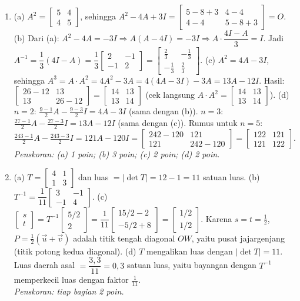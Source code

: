 \documentclass[a4paper,11pt]{article}
\newcommand{\sm}[1]{\left[\begin{smallmatrix}#1\end{smallmatrix}\right]}
\begin{document}
\begin{enumerate}[leftmargin=2em,itemsep=3pt,topsep=2pt]
\item[\textbf{3.}] (a) $A^2=\sm{5&4\\4&5}$, sehingga $A^2-4A+3I=\sm{5-8+3&4-4\\4-4&5-8+3}=O$. (b) Dari (a): $A^2-4A=-3I\Rightarrow A(A-4I)=-3I\Rightarrow A\cdot\dfrac{4I-A}{3}=I$. Jadi $A^{-1}=\dfrac13(4I-A)=\dfrac13\sm{2&-1\\-1&2}=\sm{\frac23&-\frac13\\-\frac13&\frac23}$. (c) $A^2=4A-3I$, sehingga $A^3=A\cdot A^2=4A^2-3A=4(4A-3I)-3A=13A-12I$. Hasil: $\sm{26-12&13\\13&26-12}=\sm{14&13\\13&14}$ (cek langsung $A\cdot A^2=\sm{14&13\\13&14}$). (d) $n=2$: $\frac{9-1}2A-\frac{9-3}2I=4A-3I$ (sama dengan (b)). $n=3$: $\frac{27-1}2A-\frac{27-3}2I=13A-12I$ (sama dengan (c)). Rumus untuk $n=5$: $\frac{243-1}2A-\frac{243-3}2I=121A-120I=\sm{242-120&121\\121&242-120}=\sm{122&121\\121&122}$. \\ \textit{Penskoran: (a) 1 poin; (b) 3 poin; (c) 2 poin; (d) 2 poin.}
\item[\textbf{4.}] (a) $T=\sm{4&1\\1&3}$ dan luas $=|\det T|=12-1=11$ satuan luas. (b) $T^{-1}=\dfrac1{11}\sm{3&-1\\-1&4}$. (c) $\sm{s\\t}=T^{-1}\sm{5/2\\2}=\dfrac1{11}\sm{15/2-2\\-5/2+8}=\sm{1/2\\1/2}$. Karena $s=t=\frac12$, $P=\frac12(\vec u+\vec v)$ adalah titik tengah diagonal $OW$, yaitu pusat jajargenjang (titik potong kedua diagonal). (d) $T$ mengalikan luas dengan $|\det T|=11$. Luas daerah asal $=\dfrac{3{,}3}{11}=0{,}3$ satuan luas, yaitu bayangan dengan $T^{-1}$ memperkecil luas dengan faktor $\frac1{11}$. \\ \textit{Penskoran: tiap bagian 2 poin.}

\end{enumerate}
\end{document}
